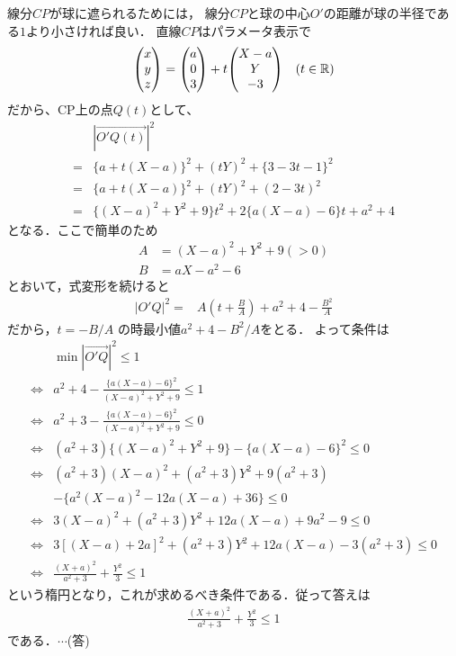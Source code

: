 \documentclass[a4paper,10pt]{ltjsarticle}
\begin{document}
\begin{multicols}{2}
  線分$CP$が球に遮られるためには，
  線分$CP$と球の中心$O'$の距離が球の半径である$1$より小さければ良い．
  直線$CP$はパラメータ表示で
  \begin{align*}
    \mqty(x   \\y \\ z)
    = \mqty(a \\ 0 \\ 3) + t \mqty(X-a \\ Y \\ -3)\quad (t \in \mathbb{R})
  \end{align*}
  だから、CP上の点$Q(t)$として、
  \begin{align*}
      & |\vec{O'Q(t)}|^2                              \\
    = & \{ a+t(X-a) \}^2 + (tY)^2 + \{ 3-3t-1 \}^2    \\
    = & \{ a+t(X-a) \}^2 + (tY)^2 + (2-3t)^2          \\
    = & \{(X-a)^2+Y^2+9\}t^2 + 2\{a(X-a)-6\}t + a^2+4
  \end{align*}
  となる．ここで簡単のため
  \begin{align*}
    A & =(X-a)^2+Y^2+9(>0) \\
    B & =aX-a^2-6
  \end{align*}
  とおいて，式変形を続けると
  \begin{align*}
    |O'Q|^2= & A\left(t+\frac{B}{A}\right)+a^2+4-\frac{B^2}{A}
  \end{align*}
  だから，$t = - B/A$ の時最小値$a^2+4-B^2/A$をとる．
  よって条件は
  \begin{align*}
                    & \min |\vec{O'Q}|^2 \le 1                                    \\
    \Leftrightarrow & a^2+4 - \frac{\{a(X-a)-6\}^2}{(X-a)^2+Y^2+9} \le 1          \\
    \Leftrightarrow & a^2+3 - \frac{\{a(X-a)-6\}^2}{(X-a)^2+Y^2+9} \le 0          \\
    \Leftrightarrow & (a^2+3) \{(X-a)^2+Y^2+9\} - \{a(X-a)-6\}^2 \le 0            \\
    \Leftrightarrow & (a^2+3)(X-a)^2+(a^2+3)Y^2+9(a^2+3)                          \\
                    & - \{a^2(X-a)^2-12a(X-a)+36\} \le 0                          \\
    \Leftrightarrow & 3(X-a)^2+(a^2+3)Y^2+12a(X-a)+9a^2-9 \le 0                   \\
    \Leftrightarrow & 3\left[(X-a)+2a\right]^2+(a^2+3)Y^2+12a(X-a)-3(a^2+3) \le 0 \\
    \Leftrightarrow & \frac{(X+a)^2}{a^2+3} + \frac{Y^2}{3} \le 1
  \end{align*}
  という楕円となり，これが求めるべき条件である．従って答えは
  \begin{align*}
    \frac{(X+a)^2}{a^2+3} + \frac{Y^2}{3} \le 1
  \end{align*}
  である．$\cdots$(答)



\end{multicols}
\end{document}
